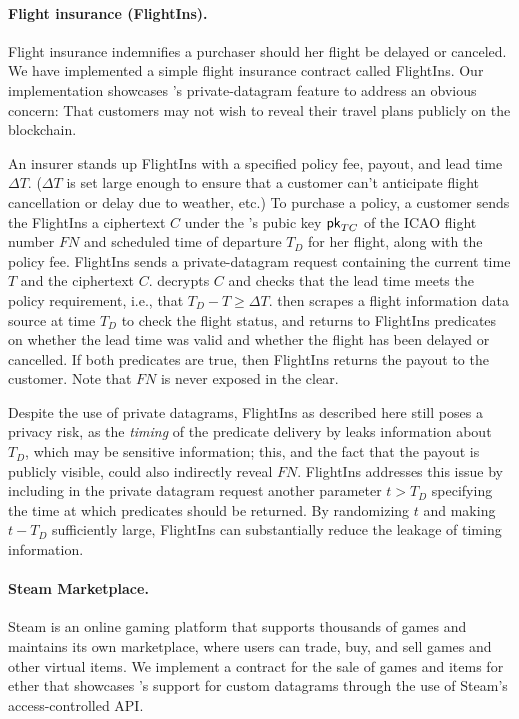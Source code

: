 \paragraph{Flight insurance ({\sf FlightIns}).} Flight insurance indemnifies a purchaser should her flight be delayed or canceled. We have implemented a simple flight insurance contract called {\sf FlightIns}. Our implementation showcases \tc's private-datagram feature to address an obvious concern:  That customers may not wish to reveal their travel plans publicly on the blockchain. 

An insurer stands up {\sf FlightIns} with a specified policy fee, payout, and lead time $\Delta T$. ($\Delta T$ is set large enough to ensure that a customer can't anticipate flight cancellation or delay due to weather, etc.) To purchase a policy, a customer sends the {\sf FlightIns} a ciphertext  $C$ under the \tc's pubic key ${\sf pk}_{TC}$ of the ICAO flight number $FN$ and scheduled time of departure $T_D$ for her flight, along with the policy fee. {\sf FlightIns} sends \tc a private-datagram request containing the current time $T$ and the ciphertext $C$. \tc decrypts $C$ and checks that the lead time meets the policy requirement, i.e., that $T_D - T \geq \Delta T$. \tc then scrapes a flight information data source at time $T_D$ to check the flight status, and returns to {\sf FlightIns} predicates on whether the lead time was valid and whether the flight has been delayed or cancelled. If both predicates are true, then {\sf FlightIns} returns the payout to the customer. Note that $FN$ is never exposed in the clear.

Despite the use of private datagrams, {\sf FlightIns} as described here still poses a privacy risk, as the {\em timing} of the predicate delivery by \tc leaks information about $T_D$, which may be sensitive information; this, and the fact that the payout is publicly visible, could also indirectly reveal $FN$. {\sf FlightIns} addresses this issue by including in the private datagram request another parameter $t > T_D$ specifying the time at which predicates should be returned. By randomizing $t$ and making $t - T_D$ sufficiently large, {\sf FlightIns} can substantially reduce the leakage of timing information. 

\paragraph{Steam Marketplace.} Steam  is an online gaming platform that supports thousands of games and maintains its own marketplace, where users can trade, buy, and sell games and other virtual items.  We implement a contract for the sale of games and items for ether that showcases \tc's support for custom datagrams through the use of Steam's access-controlled API.

